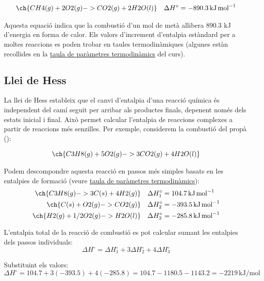\begin{equation}
\ch{CH4(g) + 2 O2(g) -> CO2(g) + 2 H2O(l)} \quad \Delta H^\circ = -890.3 \, \si{\kilo\joule\per\mole}
\end{equation}

Aquesta equació indica que la combustió d'un mol de metà allibera 890.3 kJ d'energia en forma de calor. Els valors d'increment d'entalpia estàndard per a moltes reaccions es poden trobar en taules termodinàmiques\cite{lide_crc_2005} (algunes estàn recollides en la \href{https://biocomputing-teaching.github.io/WebQuimicaAutomocio/pdf/TaulaUnitats.pdf}{taula de paràmetres termodinàmics} del curs).

\subsection{Llei de Hess}

La llei de Hess estableix que el canvi d'entalpia d'una reacció química és independent del camí seguit per arribar als productes finals, depenent només dels estats inicial i final. Això permet calcular l'entalpia de reaccions complexes a partir de reaccions més senzilles. Per exemple, considerem la combustió del propà ():

\begin{equation}
\ch{C3H8(g) + 5 O2(g) -> 3 CO2(g) + 4 H2O(l)}
\end{equation}

Podem descompondre aquesta reacció en passos més simples basats en les entalpies de formació (veure \href{https://biocomputing-teaching.github.io/WebQuimicaAutomocio/pdf/TaulaUnitats.pdf}{taula de paràmetres termodinàmics}):
\begin{align}
\ch{C3H8(g) -> 3 C(s) + 4 H2(g)} & \quad \Delta H_1^\circ = 104.7 \, \si{\kilo\joule\per\mole} \\
\ch{C(s) + O2(g) -> CO2(g)} & \quad \Delta H_2^\circ = -393.5 \, \si{\kilo\joule\per\mole} \\
\ch{H2(g) + 1/2 O2(g) -> H2O(l)} & \quad \Delta H_3^\circ = -285.8 \, \si{\kilo\joule\per\mole}
\end{align}

L'entalpia total de la reacció de combustió es pot calcular sumant les entalpies dels passos individuals:
\begin{equation}
\Delta H^\circ = \Delta H_1^\circ + 3 \Delta H_2^\circ + 4 \Delta H_3^\circ
\end{equation}

Substituint els valors:
\begin{equation}
\Delta H^\circ = 104.7 + 3(-393.5) + 4(-285.8) = 104.7 - 1180.5 - 1143.2 = -2219 \, \si{\kilo\joule\per\mole}
\end{equation}

